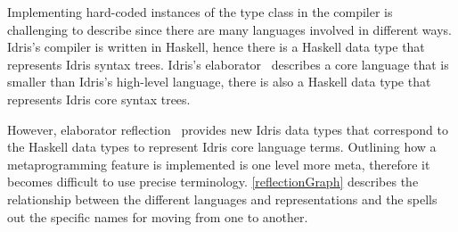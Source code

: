 Implementing hard-coded instances of the \Editorable{} type class in the
compiler is challenging to describe since there are many languages involved in
different ways. Idris's compiler is written in Haskell, hence there is a
Haskell data type that represents Idris syntax trees. Idris's
elaborator~\citep{idris} describes a core language that is smaller than Idris's
high-level language, there is also a Haskell data type that represents Idris
core syntax trees.

However, elaborator reflection~\citep{davidphd, elabref} provides new Idris
data types that correspond to the Haskell data types to represent Idris core
language terms.
Outlining how a metaprogramming feature is implemented is one level more meta,
therefore it becomes difficult to use precise terminology.
\autoref{reflectionGraph} describes the relationship between the different
languages and representations and the spells out the specific names for moving
from one to another.

